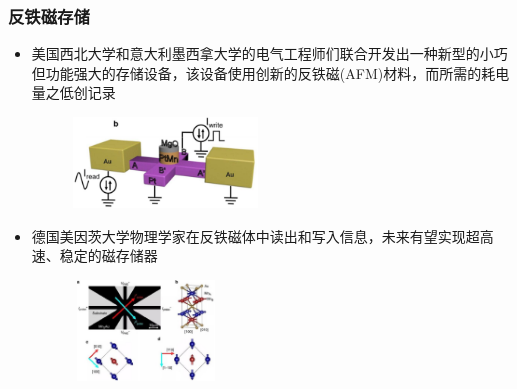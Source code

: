 \documentclass[cjk,slidestop,compress,mathserif,blue]{beamer}
\begin{document}
\frame
{
	\frametitle{反铁磁存储}
	\begin{itemize}
		\item {\tiny \textrm{美国西北大学和意大利墨西拿大学的电气工程师们联合开发出一种新型的小巧但功能强大的存储设备，该设备使用创新的反铁磁\textrm{(AFM)}材料，而所需的耗电量之低创记录}}
\begin{figure}[h!]
\vspace*{-0.08in}
\centering
\includegraphics[height=0.95in,width=1.95in]{Figures/AFM-device.png}
\label{Fig:AFM-device}
\end{figure}
\item {\tiny \textrm{德国美因茨大学物理学家在反铁磁体中读出和写入信息，未来有望实现超高速、稳定的磁存储器}}
\begin{figure}[h!]
\vspace*{-0.04in}
\centering
\includegraphics[height=1.05in,width=1.55in]{Figures/AFM-Memory.png}
\label{Fig:AFM-Memory}
\end{figure}
	\end{itemize}
}
\end{document}
